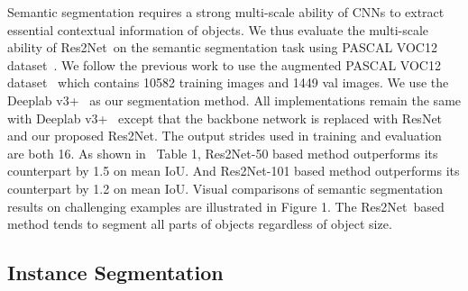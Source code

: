 \documentclass[10pt,journal,cspaper,compsoc]{IEEEtran}
\newcommand{\figref}[1]{Figure 1}\newcommand{\tabref}[1]{Table 1}\newcommand{\secref}[1]{Section 1}
\newcommand{\figref}[1]{Fig.~\ref{#1}}\newcommand{\tabref}[1]{Table~\ref{#1}}\newcommand{\secref}[1]{Sec.~\ref{#1}}
\newcommand{\ourM}{{Res2Net}}
\begin{document}
Semantic segmentation requires a strong multi-scale ability of CNNs
to extract essential contextual information of objects.
We thus evaluate the multi-scale ability of \ourM~on the semantic segmentation task
using PASCAL VOC12 dataset~\cite{everingham2015pascal}.
We follow the previous work to use the augmented PASCAL VOC12
dataset~\cite{hariharan2011semantic}
which contains 10582 training images and 1449 val images.
We use the Deeplab v3+~\cite{Chen_2018_ECCV} as our segmentation method.
All implementations remain the same with Deeplab v3+~\cite{Chen_2018_ECCV}
except that the backbone network is replaced with ResNet and our proposed \ourM.
The output strides used in training and evaluation are both 16.
As shown in ~\tabref{tab:semantic_segmentation},
\ourM-50 based method outperforms its counterpart by 1.5 on mean IoU.
And \ourM-101 based method outperforms its counterpart by 1.2 on mean IoU.
Visual comparisons of semantic segmentation results on challenging examples 
are illustrated in \figref{fig:segvis}.
The \ourM~based method tends to segment all parts of objects 
regardless of object size.



\subsection{Instance Segmentation}
\end{document}
